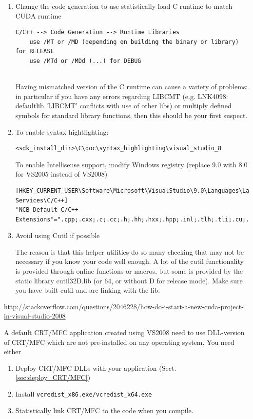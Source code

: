 \begin{enumerate}
   \item Change the code generation to use statistically load C runtime to
   match CUDA runtime 
 \begin{verbatim}
C/C++ --> Code Generation --> Runtime Libraries	
    use /MT or /MD (depending on building the binary or library) for RELEASE
    use /MTd or /MDd (...) for DEBUG
   
 \end{verbatim}   
 Having mismatched version of the C runtime can cause a variety of problems; in
 particular if you have any errors regarding LIBCMT (e.g. LNK4098: defaultlib
 'LIBCMT' conflicts with use of other libs) or multiply defined symbols for
 standard library functions, then this should be your first suspect.  
 
 \item To enable syntax hightlighting:
 \begin{verbatim}
<sdk_install_dir>\C\doc\syntax_highlighting\visual_studio_8 
 \end{verbatim} 
 
 To enable Intellisense support, modify Windows registry (replace 9.0 with 8.0
 for VS2005 instead of VS2008)
 \begin{verbatim}
[HKEY_CURRENT_USER\Software\Microsoft\VisualStudio\9.0\Languages\Language Services\C/C++]
"NCB Default C/C++ Extensions"=".cpp;.cxx;.c;.cc;.h;.hh;.hxx;.hpp;.inl;.tlh;.tli;.cu;.cuh;.cl" 
 \end{verbatim}
 
 \item Avoid using Cutil if possible
 
 The reason is that this helper utilities do so many checking that may not be
 necessary if you know your code well enough. A lot of the cutil functionality
 is provided through online functions or macros, but some is provided by the
 static library cutil32D.lib (or 64, or without D for release mode). Make sure
 you have built cutil and are linking with the lib.  
\end{enumerate}


\url{http://stackoverflow.com/questions/2046228/how-do-i-start-a-new-cuda-project-in-visual-studio-2008}


A default CRT/MFC application created using VS2008 need to use DLL-version of
CRT/MFC which are not pre-installed on any operating system. You need either
\begin{enumerate}
  \item Deploy CRT/MFC DLLs with your application
  (Sect.\ref{sec:deploy_CRT/MFC})
  \item Install \verb!vcredist_x86.exe/vcredist_x64.exe! 
  \item Statistically link CRT/MFC to the code when you compile.
\end{enumerate}


